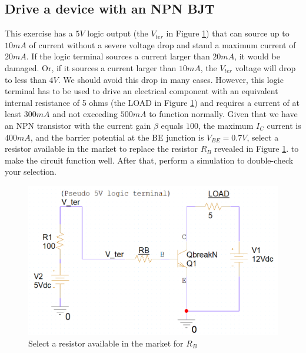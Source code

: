 \subsection{Drive a device with an NPN BJT}
This exercise has a $5V$ logic output (the $V_{ter}$ in Figure \ref{lab3_ex2_de}) that can source up to $10mA$ of current without a severe voltage drop and stand a maximum current of $20mA$. If the logic terminal sources a current larger than $20mA$, it would be damaged. Or, if it sources a current larger than $10mA$, the $V_{ter}$ voltage will drop to less than $4V$. We should avoid this drop in many cases.  However, this logic terminal has to be used to drive an electrical component with an equivalent internal resistance of 5 ohms (the LOAD in Figure \ref{lab3_ex2_de}) and requires a current of at least $300mA$ and not exceeding $500mA$ to function normally.
Given that we have an NPN transistor with the current gain $\beta$ equals $100$, the maximum $I_C$ current is $400mA$, and the barrier potential at the BE junction is $V_{BE} = 0.7V$, select a resistor available in the market to replace the resistor $R_B$ revealed in Figure \ref{lab3_ex2_de}. to make the circuit function well. After that, perform a simulation to double-check your selection.

\begin{figure}[H]
    \centering
    \includegraphics[width=12cm]{source/picture/bai_3/lab3_ex2_de.png}
    \caption{Select a resistor available in the market for $R_B$}
    \label{lab3_ex2_de}
\end{figure}

